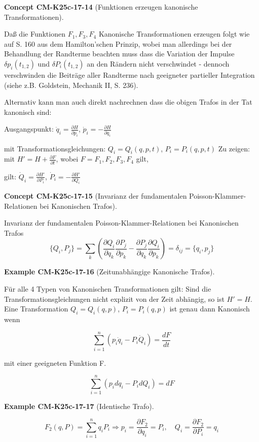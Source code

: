 \documentclass[10pt, letterpaper]{article}
\newcommand{\CustomHeading}[3]{%
  \par\medskip\noindent%
  \textbf{#1 #2} \textnormal{(#3)}.\enskip%
}
\newenvironment{EXA}[2]{\CustomHeading{Example}{#1}{#2}}{}
\newenvironment{CONC}[2]{\CustomHeading{Concept}{#1}{#2}}{}
\begin{document}
\begin{CONC}{CM-K25c-17-14}{Funktionen erzeugen kanonische Transformationen}
Daß die Funktionen $F_1, F_3, F_4$ Kanonische Transformationen erzeugen folgt wie auf S. 160 aus dem Hamilton'schen Prinzip, wobei man allerdings bei der Behandlung der Randterme beachten muss dass die Variation der Impulse $\delta p_i(t_{1,2})$ und $\delta P_i(t_{1,2})$ an den Rändern nicht verschwindet - dennoch verschwinden die Beiträge aller Randterme nach geeigneter partieller Integration (siehe z.B. Goldstein, Mechanik II, S. 236).

Alternativ kann man auch direkt nachrechnen dass die obigen Trafos in der Tat kanonisch sind:

Ausgangspunkt: $\dot{q}_i = \frac{\partial H}{\partial p_i}$, $\dot{p}_i = -\frac{\partial H}{\partial q_i}$

mit Transformationsgleichungen:
$Q_i = Q_i(q,p,t)$, $P_i = P_i(q,p,t)$
Zu zeigen: mit $H' = H + \frac{\partial F}{\partial t}$, wobei $F = F_1, F_2, F_3, F_4$ gilt,

gilt: $\dot{Q}_i = \frac{\partial H'}{\partial P_i}$, $\dot{P}_i = -\frac{\partial H'}{\partial Q_i}$
\end{CONC}

\begin{CONC}{CM-K25c-17-15}{Invarianz der fundamentalen Poisson-Klammer-Relationen bei Kanonischen Trafos}
Invarianz der fundamentalen Poisson-Klammer-Relationen bei Kanonischen Trafos
\[
\{Q_i, P_j\} = \sum_k \left(\frac{\partial Q_i}{\partial q_k}\frac{\partial P_j}{\partial p_k} - \frac{\partial P_j}{\partial q_k}\frac{\partial Q_i}{\partial p_k}\right) = \delta_{ij} = \{q_i, p_j\}
\]
\end{CONC}

\begin{EXA}{CM-K25c-17-16}{Zeitunabhängige Kanonische Trafos}
Für alle 4 Typen von Kanonischen Transformationen gilt:
Sind die Transformationsgleichungen nicht explizit von der Zeit abhängig, so ist $H' = H$. Eine Transformation $Q_i = Q_i(q,p)$, $P_i = P_i(q,p)$ ist genau dann Kanonisch wenn

\[\sum_{i=1}^n (p_i\dot{q}_i - P_i\dot{Q}_i) = \frac{dF}{dt}\]

mit einer geeigneten Funktion F.

\[\sum_{i=1}^n (p_idq_i - P_idQ_i) = dF\]
\end{EXA}

\begin{EXA}{CM-K25c-17-17}{Identische Trafo}
\[F_2(q,P) = \sum_{i=1}^n q_iP_i \Rightarrow p_i = \frac{\partial F_2}{\partial q_i} = P_i, \quad Q_i = \frac{\partial F_2}{\partial P_i} = q_i\]
\end{EXA}
\end{document}
